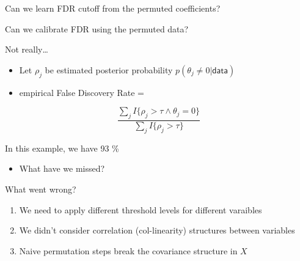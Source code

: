 \documentclass[
  ignorenonframetext,
  aspectratio=169]{beamer}
\providecommand{\tightlist}{%
  \setlength{\itemsep}{0pt}\setlength{\parskip}{0pt}}
\begin{document}
\begin{frame}{Can we learn FDR cutoff from the permuted coefficients?}
\protect\hypertarget{can-we-learn-fdr-cutoff-from-the-permuted-coefficients}{}
\scriptsize

\normalsize

\scriptsize


\normalsize

\scriptsize


\normalsize
\end{frame}

\begin{frame}{Can we calibrate FDR using the permuted data?}
\protect\hypertarget{can-we-calibrate-fdr-using-the-permuted-data}{}
\large

Not really\ldots{}

\begin{itemize}
\item
  Let \(\rho_{j}\) be estimated posterior probability
  \(p(\theta_{j} \neq 0|\textsf{data})\)
\item
  empirical False Discovery Rate =
\end{itemize}

\[\frac{\sum_{j} I\{\rho_{j} > \tau \wedge \theta_{j} = 0 \}}{\sum_{j} I\{ \rho_{j} > \tau \}}\]

\scriptsize

\normalsize

In this example, we have 93 \%

\begin{itemize}
\tightlist
\item
  What have we missed?
\end{itemize}
\end{frame}

\begin{frame}{What went wrong?}
\protect\hypertarget{what-went-wrong}{}
\Large

\begin{enumerate}
\item
  We need to apply different threshold levels for different varaibles
\item
  We didn't consider correlation (col-linearity) structures between
  variables
\item
  Naive permutation steps break the covariance structure in \(X\)
\end{enumerate}
\end{frame}
\end{document}
